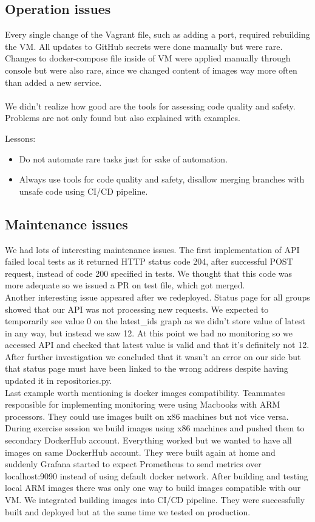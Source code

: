 \documentclass{article}
\begin{document}
\subsection{Operation issues}
Every single change of the Vagrant file, such as adding a port, required rebuilding the VM. All updates to GitHub secrets were done manually but were rare. Changes to docker-compose file inside of VM were applied manually through console but were also rare, since we changed content of images way more often than added a new service.
\\\\
We didn't realize how good are the tools for assessing code quality and safety. Problems are not only found but also explained with examples.

Lessons:
\begin{itemize}
    \item Do not automate rare tasks just for sake of automation.
    \item Always use tools for code quality and safety, disallow merging branches with unsafe code using CI/CD pipeline.
\end{itemize}

\subsection{Maintenance issues}
We had lots of interesting maintenance issues. The first implementation of API failed local tests as it returned HTTP status code 204, after successful POST request, instead of code 200 specified in tests. We thought that this code was more adequate so we issued a PR on test file, which got merged.\\
Another interesting issue appeared after we redeployed. Status page for all groups showed that our API was not processing new requests. We expected to temporarily see value 0 on the latest\_ids graph as we didn't store value of latest in any way, but instead we saw 12. At this point we had no monitoring so we accessed API and checked that latest value is valid and that it's definitely not 12. After further investigation we concluded that it wasn't an error on our side but that status page must have been linked to the wrong address despite having updated it in repositories.py.\\
Last example worth mentioning is docker images compatibility. Teammates responsible for implementing monitoring were using Macbooks with ARM processors. They could use images built on x86 machines but not vice versa. During exercise session we build images using x86 machines and pushed them to secondary DockerHub account. Everything worked but we wanted to have all images on same DockerHub account. They were built again at home and suddenly Grafana started to expect Prometheus to send metrics over localhost:9090 instead of using default docker network. After building and testing local ARM images there was only one way to build images compatible with our VM. We integrated building images into CI/CD pipeline. They were successfully built and deployed but at the same time we tested on production.
\end{document}

